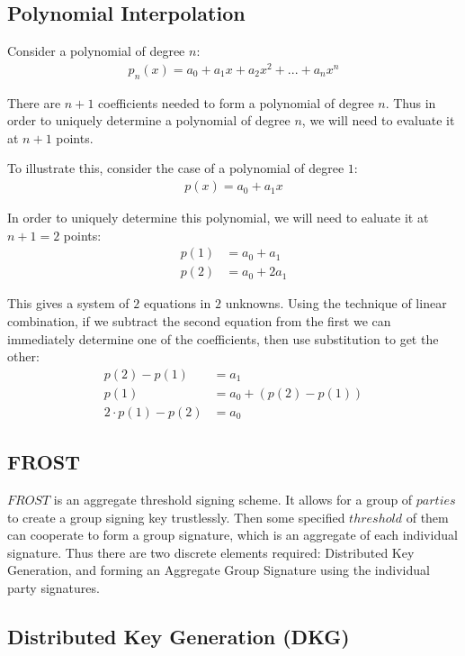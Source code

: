 \documentclass{article}
\begin{document}
\subsection{
  Polynomial Interpolation
}

Consider a polynomial of degree $n$:
\begin{align}
  p_n(x) = a_0 + a_1 x + a_2 x^2 + ... + a_n x^n
\end{align}

There are $n+1$ coefficients needed to form a polynomial of degree $n$.  Thus in order to uniquely determine a polynomial of degree $n$, we will need to evaluate it at $n+1$ points.

To illustrate this, consider the case of a polynomial of degree $1$:
\begin{align}
  p(x) = a_0 + a_1 x
\end{align}

In order to uniquely determine this polynomial, we will need to ealuate it at $n+1 = 2$ points:
\begin{align}
  p(1) &= a_0 + a_1\\
  p(2) &= a_0 + 2 a_1 
\end{align}

This gives a system of $2$ equations in $2$ unknowns.  Using the technique of linear combination, if we subtract the second equation from the first we can immediately determine one of the coefficients, then use substitution to get the other:
\begin{align}
  p(2) - p(1) &= a_1\\
  p(1) &= a_0 + (p(2) - p(1))\\
  2 \cdot p(1) - p(2) &= a_0
\end{align}

\subsection{
  FROST
}

$FROST$ is an aggregate threshold signing scheme.  It allows for a group of $parties$ to create a group signing key trustlessly.  Then some specified $threshold$ of them can cooperate to form a group signature, which is an aggregate of each individual signature.  Thus there are two discrete elements required: Distributed Key Generation, and forming an Aggregate Group Signature using the individual party signatures.

\subsection{
  Distributed Key Generation (DKG)
}
\end{document}
